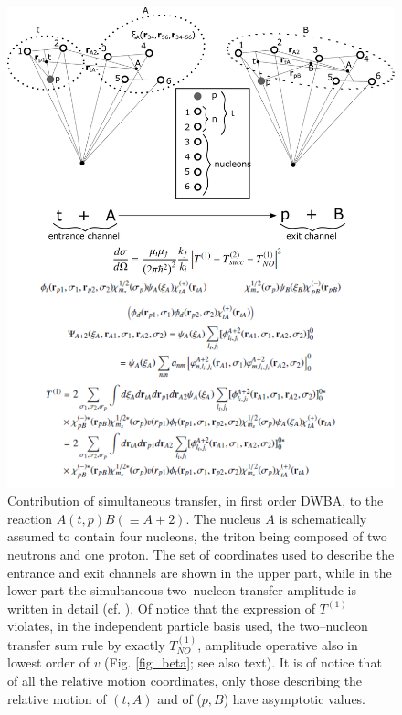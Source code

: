 \begin{figure}
\centerline{\includegraphics*[width=\textwidth,angle=0]{nutshell/figs/fig_alpha.pdf}}
\caption{Contribution of simultaneous transfer, in first order DWBA, to the reaction $A(t,p)B(\equiv A+2)$. The nucleus $A$ is schematically assumed to contain four nucleons, the triton being composed of two neutrons and one proton. The set of coordinates used to describe the entrance and exit channels are shown in the upper part, while in the lower part the simultaneous two--nucleon transfer amplitude is written in detail (cf. \cite{Potel:13b}). Of notice that the expression of $T^{(1)}$ violates, in the independent particle basis used, the  two--nucleon transfer sum rule by exactly $T^{(1)}_{NO}$, amplitude operative also in lowest order of $v$ (Fig. \ref{fig_beta}; see also text). It is of notice that of all the relative motion coordinates, only those describing the relative motion of $(t,A)$ and of ($p,B$) have asymptotic values.}\label{fig_alpha}
\end{figure}
